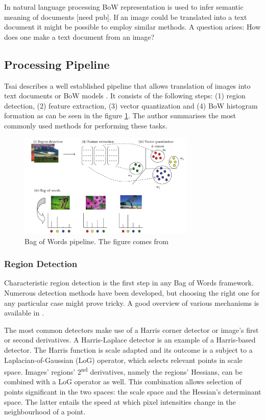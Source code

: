 	In natural language processing BoW representation is used to infer semantic meaning of documents [need pub]. If an image could be translated into a text document it might be possible to employ similar methods. A question arises: How does one make a text document from an image?

	\subsection{Processing Pipeline}	
	Tsai describes a well established pipeline that allows translation of images into text documents or BoW models \cite{tsai2012bag}. It consists of the following steps: (1) region detection, (2) feature extraction, (3) vector quantization and (4) BoW histogram formation as can be seen in the figure \ref{fig:bow_pipeline}. The author summarises the most commonly used methods for performing these tasks. 
	
	\begin{figure}[!ht]
	\centering
	\includegraphics[width=0.75\textwidth]{figs/tsai2012}
	\caption{Bag of Words pipeline. The figure comes from \cite{tsai2012bag}}
	\label{fig:bow_pipeline}
	\end{figure}
	
		\subsubsection{Region Detection}
		Characteristic region detection is the first step in any Bag of Words framework. Numerous detection methods have been developed, but choosing the right one for any particular case might prove tricky. A good overview of various mechanisms is available in \cite{tsai2012bag}.
		
		The most common detectors make use of a Harris corner detector or image's first or second derivatives. A Harris-Laplace detector is an example of a Harris-based detector. The Harris function is scale adapted and its outcome is a subject to a Laplacian-of-Gaussian (LoG) operator, which selects relevant points in scale space. Images' regions' 2\textsuperscript{nd} derivatives, namely the regions' Hessians, can be combined with a LoG operator as well. This combination allows selection of points significant in the two spaces: the scale space and the Hessian's determinant space. The latter entails the speed at which pixel intensities change in the neighbourhood of a point.	
	
